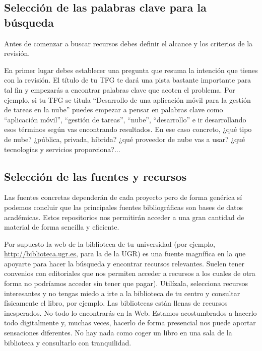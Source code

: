 \subsection{Selección de las palabras clave para la búsqueda}

Antes de comenzar a buscar recursos debes definir el alcance y los criterios de la revisión. 

En primer lugar debes establecer una pregunta que resuma la intención que tienes con la revisión. El título de tu TFG te dará una pista bastante importante para tal fin y empezarás a encontrar palabras clave que acoten el problema. Por ejemplo, si tu TFG se titula ``Desarrollo de una aplicación móvil para la gestión de tareas en la nube'' puedes empezar a pensar en palabras clave como ``aplicación móvil'', ``gestión de tareas'', ``nube'', ``desarrollo'' e ir desarrollando esos términos según vas encontrando resultados. En ese caso concreto, ¿qué tipo de nube? ¿pública, privada, híbrida? ¿qué proveedor de nube vas a usar? ¿qué tecnologías y servicios proporciona?...


\subsection{Selección de las fuentes y recursos}

Las fuentes concretas dependerán de cada proyecto pero de forma genérica sí podemos concluir que las principales fuentes bibliográficas son bases de datos académicas. Estos repositorios nos permitirán acceder a una gran cantidad de material de forma sencilla y eficiente. 

Por supuesto la web de la biblioteca de tu universidad (por ejemplo, \url{http://biblioteca.ugr.es}, para la de la UGR) es una fuente magnífica en la que apoyarte para hacer la búsqueda y encontrar recursos relevantes. Suelen tener convenios con editoriales que nos permiten acceder a recursos a los cuales de otra forma no podríamos acceder sin tener que pagar). Utilízala, selecciona recursos interesantes y no tengas miedo a irte a la biblioteca de tu centro y consultar físicamente el libro, por ejemplo. Las bibliotecas están llenas de recursos inesperados. No todo lo encontrarás en la Web. Estamos acostumbrados a hacerlo todo digitalmente y, muchas veces, hacerlo de forma presencial nos puede aportar sensaciones diferentes. No hay nada como coger un libro en una sala de la biblioteca y consultarlo con tranquilidad. 

